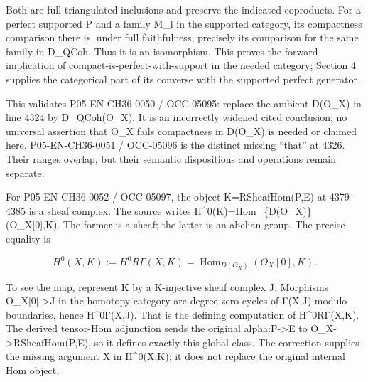 \documentclass[11pt]{article}
\begin{document}
Both are full triangulated inclusions and preserve the indicated coproducts. For a perfect supported P and a family M\_\allowbreak{}l in the supported category,\allowbreak{} its compactness comparison there is,\allowbreak{} under full faithfulness,\allowbreak{} precisely its comparison for the same family in D\_\allowbreak{}QCoh. Thus it is an isomorphism. This proves the forward implication of compact-is-perfect-with-support in the needed category; Section 4 supplies the categorical part of its converse with the supported perfect generator.

This validates P05-EN-CH36-0050 /\allowbreak{} OCC-05095:\allowbreak{} replace the ambient D(O\_\allowbreak{}X)\allowbreak{} in line 4324 by D\_\allowbreak{}QCoh(O\_\allowbreak{}X)\allowbreak{}. It is an incorrectly widened cited conclusion; no universal assertion that O\_\allowbreak{}X fails compactness in D(O\_\allowbreak{}X)\allowbreak{} is needed or claimed here. P05-EN-CH36-0051 /\allowbreak{} OCC-05096 is the distinct missing ``that'' at 4326. Their ranges overlap,\allowbreak{} but their semantic dispositions and operations remain separate.

For P05-EN-CH36-0052 /\allowbreak{} OCC-05097,\allowbreak{} the object K\allowbreak{}=RSheafHom(P,\allowbreak{}E)\allowbreak{} at 4379–\allowbreak{}4385 is a sheaf complex. The source writes H\textasciicircum{}0(K)\allowbreak{}\allowbreak{}=Hom\_\allowbreak{}\{D(O\_\allowbreak{}X)\allowbreak{}\}(O\_\allowbreak{}X[0]\allowbreak{},\allowbreak{}K)\allowbreak{}. The former is a sheaf; the latter is an abelian group. The precise equality is

\[
 H^0(X,K):=H^0R\Gamma(X,K)
      =\operatorname{Hom}_{D(O_X)}(O_X[0],K).
\]

To see the map,\allowbreak{} represent K by a K-injective sheaf complex J. Morphisms O\_\allowbreak{}X[0]\allowbreak{}\allowbreak{}->J in the homotopy category are degree-zero cycles of Γ(X,\allowbreak{}J)\allowbreak{} modulo boundaries,\allowbreak{} hence H\textasciicircum{}0Γ(X,\allowbreak{}J)\allowbreak{}. That is the defining computation of H\textasciicircum{}0RΓ(X,\allowbreak{}K)\allowbreak{}. The derived tensor-Hom adjunction sends the original alpha:\allowbreak{}P\allowbreak{}->E to O\_\allowbreak{}X\allowbreak{}->RSheafHom(P,\allowbreak{}E)\allowbreak{},\allowbreak{} so it defines exactly this global class. The correction supplies the missing argument X in H\textasciicircum{}0(X,\allowbreak{}K)\allowbreak{}; it does not replace the original internal Hom object.
\end{document}
